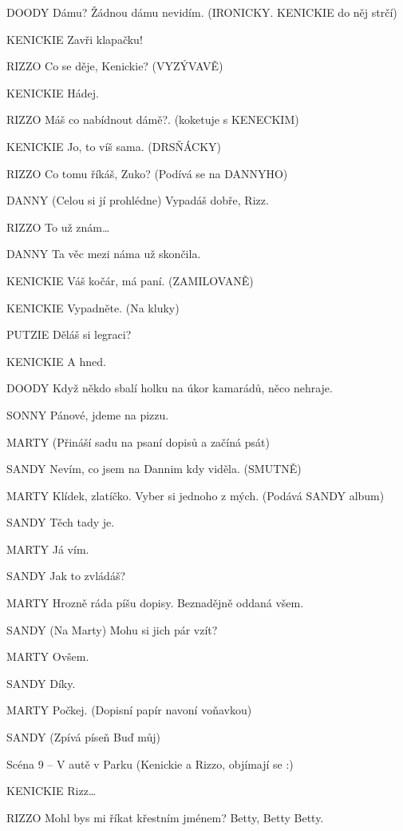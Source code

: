 DOODY        Dámu? Žádnou dámu nevidím. (IRONICKY. KENICKIE do něj strčí) 

KENICKIE        Zavři klapačku!

RIZZO        Co se děje, Kenickie? (VYZÝVAVĚ) 

KENICKIE        Hádej.

RIZZO        Máš co nabídnout dámě?. (koketuje s KENECKIM) 

KENICKIE        Jo, to víš sama. (DRSŇÁCKY) 

RIZZO        Co tomu říkáš, Zuko? (Podívá se na DANNYHO)

DANNY        (Celou si jí prohlédne) Vypadáš dobře, Rizz.

RIZZO         To už znám…

DANNY        Ta věc mezi náma už skončila.  

KENICKIE        Váš kočár, má paní. (ZAMILOVANĚ) 

KENICKIE        Vypadněte. (Na kluky)

PUTZIE        Děláš si legraci?

KENICKIE        A hned.

DOODY        Když někdo sbalí holku na úkor kamarádů, něco nehraje. 

SONNY        Pánové, jdeme na pizzu.

        

MARTY        (Přináší sadu na psaní dopisů a začíná psát)

SANDY        Nevím, co jsem na Dannim kdy viděla. (SMUTNĚ)

MARTY        Klídek, zlatíčko. Vyber si jednoho z mých. (Podává SANDY album)

SANDY        Těch tady je. 

MARTY        Já vím.

SANDY        Jak to zvládáš?

MARTY        Hrozně ráda píšu dopisy. Beznadějně oddaná všem.

SANDY        (Na Marty) Mohu si jich pár vzít?

MARTY        Ovšem.

SANDY        Díky.

MARTY        Počkej. (Dopisní papír navoní voňavkou)

SANDY        (Zpívá píseň Buď můj)

Scéna 9 – V autě v Parku (Kenickie a Rizzo, objímají se :)

KENICKIE        Rizz…

RIZZO        Mohl bys mi říkat křestním jménem? Betty, Betty Betty.

